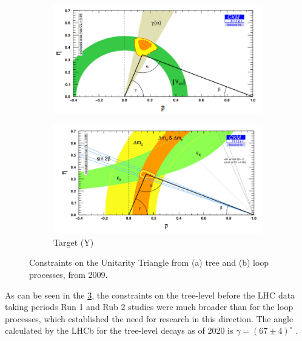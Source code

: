 \begin{figure}[H]
\centering
\begin{subfigure}[b]{0.45\textwidth}
    \centering
    \includegraphics[width=\linewidth]{figures/chapter1/lhcb_goals_a.png}
\caption{}
   \label{plot:plot_triangle_a}
  \end{subfigure}
\begin{subfigure}[b]{0.45\textwidth}
    \centering
    \includegraphics[width=\linewidth]{figures/chapter1/lhcb_goals_b.png}
\caption{Target (Y)}
   \label{plot:plot_triangle_b}
  \end{subfigure}
  \caption[Triangle constraints]{Constraints on the Unitarity Triangle from (a) tree and (b) loop processes, from 2009.}
    \label{plot:both_triangles}
\end{figure}

As can be seen in the \ref{plot:both_triangles}, the constraints on the tree-level before the LHC data taking periods \cite{thelhcbcollaboration2010roadmap} Run 1 and Rub 2  studies were much broader than for the loop processes, which established the need for research in this direction.
The angle calculated by the LHCb for the tree-level decays as of 2020 is $γ = (67 \pm 4)^{\circ}$ \cite{LHCb-CONF-2020-003}.

